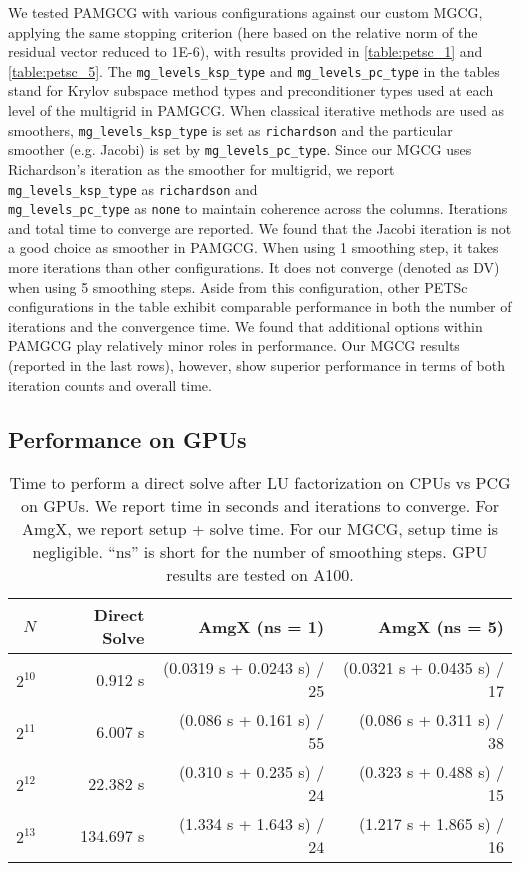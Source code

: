We tested PAMGCG with various configurations against our custom MGCG, applying the same stopping criterion (here based on the relative norm of the residual vector reduced to 1E-6), with results provided in \autoref{table:petsc_1} and \autoref{table:petsc_5}.
The \texttt{mg\_levels\_ksp\_type} and \texttt{mg\_levels\_pc\_type} in the tables stand for Krylov subspace method types and preconditioner types used at each level of the multigrid in PAMGCG. When classical iterative methods are used as smoothers, \texttt{mg\_levels\_ksp\_type} is set as \texttt{richardson} and the particular smoother (e.g. Jacobi) is set by \texttt{mg\_levels\_pc\_type}.
Since our MGCG uses Richardson's iteration as the smoother for multigrid, we report \texttt{mg\_levels\_ksp\_type} as \texttt{richardson} and \\
\texttt{mg\_levels\_pc\_type} as \texttt{none} to maintain coherence across the columns. Iterations and total time to converge are reported.
We found that the Jacobi iteration is not a good choice as smoother in PAMGCG. 
When using 1 smoothing step, it takes more iterations than other configurations.
It does not converge (denoted as DV) when using 5 smoothing steps.
Aside from this configuration, other PETSc configurations in the table exhibit comparable performance in both the number of iterations and the convergence time. We found that additional options within PAMGCG play relatively minor roles in performance. Our MGCG results (reported in the last rows), however, show superior performance in terms of both iteration counts and overall time. 


\subsection{Performance on GPUs}
\begin{table*}
    \caption{Time to perform a direct solve after LU factorization on CPUs vs PCG on GPUs. We report time in seconds and iterations to converge. For AmgX, we report setup + solve time. For our MGCG, setup time is negligible. ``$\mathrm{ns}$'' is short for the number of smoothing steps. GPU results are tested on A100.}
    \small
    \centering
    \begin{tabular}{rrrr}
    \toprule
    $N$     & Direct Solve  & AmgX (ns = 1) & AmgX (ns = 5) \\
    \midrule
    $2^{10}$  &   0.912 s & (0.0319 s + 0.0243 s) / 25  & (0.0321 s + 0.0435 s) / 17   \\
    $2^{11}$ & 6.007 s &  (0.086 s + 0.161 s) / 55   &  (0.086 s + 0.311 s) / 38    \\
    $2^{12}$ & 22.382 s  & (0.310 s + 0.235 s) / 24  &  (0.323 s + 0.488 s) / 15         \\
    $2^{13}$ & 134.697 s  & (1.334 s + 1.643 s) / 24   & (1.217 s + 1.865 s) / 16     \\
    \bottomrule
    \end{tabular}
    \label{tab:mgcg_1} 
\end{table*}


